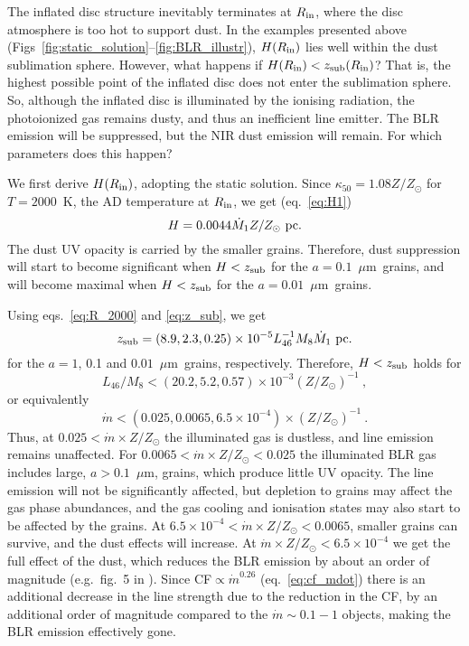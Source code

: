 \documentclass[a4paper,fleqn,usenatbib]{mnras}
\newcommand{\mdot}{\dot{M}}
\newcommand{\mic}{\mbox{$\mu$m}}
\begin{document}
The inflated disc structure inevitably terminates at $R_{\rm in}$, where the disc atmosphere is
too hot to support dust. In the examples presented above 
(Figs~\ref{fig:static_solution}--\ref{fig:BLR_illustr}), $H(R_{\rm in})$ lies well within the
dust sublimation sphere. However, what happens if $H(R_{\rm in})<z_{\rm sub}(R_{\rm in})$?
That is, the highest possible point of the inflated disc does not enter the sublimation sphere. So, although
the inflated disc is illuminated by the ionising radiation, the photoionized gas remains dusty,
and thus an inefficient line emitter. The BLR emission will be suppressed, but the NIR dust 
emission will remain. For which parameters does this happen?

We first derive $H(R_{\rm in})$, adopting the static solution. Since $\kappa_{50}=1.08Z/Z_{\odot}$ for $T=2000$~K, the
AD temperature at $R_{\rm in}$, we get (eq.~\ref{eq:H1}) 
\begin{equation}
H=0.0044\mdot_1 Z/Z_{\odot}~{\rm pc}.
\end{equation}
The dust UV opacity is carried by the smaller grains. 
Therefore, dust suppression will
start to become significant when $H<z_{\rm sub}$ for the $a=0.1$~\mic\ grains, and will
become maximal when $H<z_{\rm sub}$ for the $a=0.01$~\mic\ grains.


Using eqs.~\ref{eq:R_2000} and \ref{eq:z_sub}, we get 
\begin{equation}
z_{\rm sub}=(8.9, 2.3, 0.25)\times 10^{-5}L_{46}^{-1}M_8\mdot_1~{\rm pc} .
\end{equation}
for the $a=1$, 0.1 and $0.01$~\mic\ grains, respectively. Therefore, $H<z_{\rm sub}$ holds for 
\begin{equation}
L_{46}/M_8<(20.2, 5.2, 0.57)\times 10^{-3}(Z/Z_{\odot})^{-1}\ , 
\end{equation}
or equivalently
\begin{equation}
\dot{m}<(0.025, 0.0065, 6.5\times 10^{-4})\times (Z/Z_{\odot})^{-1}\ .
\end{equation}
Thus, at $0.025<\dot{m}\times Z/Z_{\odot}$ the illuminated gas is dustless, and line emission remains unaffected.
For $0.0065<\dot{m}\times Z/Z_{\odot}<0.025$ the illuminated BLR gas includes large, $a>0.1$~\mic, grains,
which produce little UV opacity. The line emission will not be significantly affected, 
but depletion to grains may affect the gas phase abundances,
and the gas cooling and ionisation states may also start to be affected by the grains.
At $6.5\times 10^{-4}<\dot{m}\times Z/Z_{\odot}<0.0065$, smaller grains can survive, and 
the dust effects will increase. At $\dot{m}\times Z/Z_{\odot}<6.5\times 10^{-4}$ we get the full effect
of the dust, which reduces the BLR emission by about an order of magnitude (e.g.\ fig.~5 in 
\citealt{paperII}). Since CF$\propto \dot{m}^{0.26}$ (eq.~\ref{eq:cf_mdot}) there is an additional 
decrease in the line strength due to the reduction in the CF, by an additional order of magnitude
compared to the $\dot{m}\sim 0.1-1$ objects, making the BLR emission effectively gone.  
\end{document}
